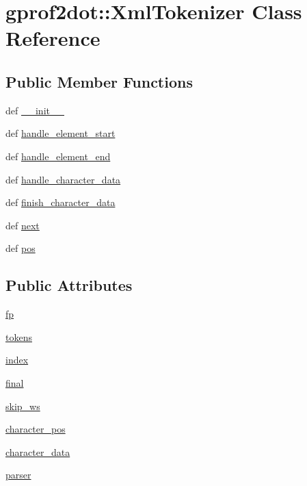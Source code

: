 \hypertarget{classgprof2dot_1_1XmlTokenizer}{
\section{gprof2dot::XmlTokenizer Class Reference}
\label{classgprof2dot_1_1XmlTokenizer}
}
\subsection*{Public Member Functions}
\begin{DoxyCompactItemize}
\item 
def \hyperlink{classgprof2dot_1_1XmlTokenizer_ae1f45ca5dbb6c4dce21534be2aa3643f}{\_\-\_\-init\_\-\_\-}
\item 
def \hyperlink{classgprof2dot_1_1XmlTokenizer_a80681c721f8cca08d474fc1ebba45f2e}{handle\_\-element\_\-start}
\item 
def \hyperlink{classgprof2dot_1_1XmlTokenizer_a18370d070bda2a5d795818fcacc67b9b}{handle\_\-element\_\-end}
\item 
def \hyperlink{classgprof2dot_1_1XmlTokenizer_a18c5bde4d75a54eee88467c0ce575318}{handle\_\-character\_\-data}
\item 
def \hyperlink{classgprof2dot_1_1XmlTokenizer_aee80d31081b69f03bbd7f6570e95553c}{finish\_\-character\_\-data}
\item 
def \hyperlink{classgprof2dot_1_1XmlTokenizer_a77ec97f2e711ca509c3b15d5c8f8deb0}{next}
\item 
def \hyperlink{classgprof2dot_1_1XmlTokenizer_ac2aacdda25050b6d645e97c2a511739b}{pos}
\end{DoxyCompactItemize}
\subsection*{Public Attributes}
\begin{DoxyCompactItemize}
\item 
\hyperlink{classgprof2dot_1_1XmlTokenizer_adcf837640c298212adaaf3fa97967ad7}{fp}
\item 
\hyperlink{classgprof2dot_1_1XmlTokenizer_a463b3e42d9b9d9cf1135d61a302123e5}{tokens}
\item 
\hyperlink{classgprof2dot_1_1XmlTokenizer_acf89c22a97b9ecfd1985ece5c88f4626}{index}
\item 
\hyperlink{classgprof2dot_1_1XmlTokenizer_a2fcb60f0f699e70e34ce340569d15476}{final}
\item 
\hyperlink{classgprof2dot_1_1XmlTokenizer_acf3445af8c53403394b50b0e75f09948}{skip\_\-ws}
\item 
\hyperlink{classgprof2dot_1_1XmlTokenizer_a04573673dad3be8574a7ad8d35166a19}{character\_\-pos}
\item 
\hyperlink{classgprof2dot_1_1XmlTokenizer_a84df3599b0cf4ebdae88952b1badea56}{character\_\-data}
\item 
\hyperlink{classgprof2dot_1_1XmlTokenizer_a98db4e33433d6d6970c8df9cfde92c9f}{parser}
\end{DoxyCompactItemize}


